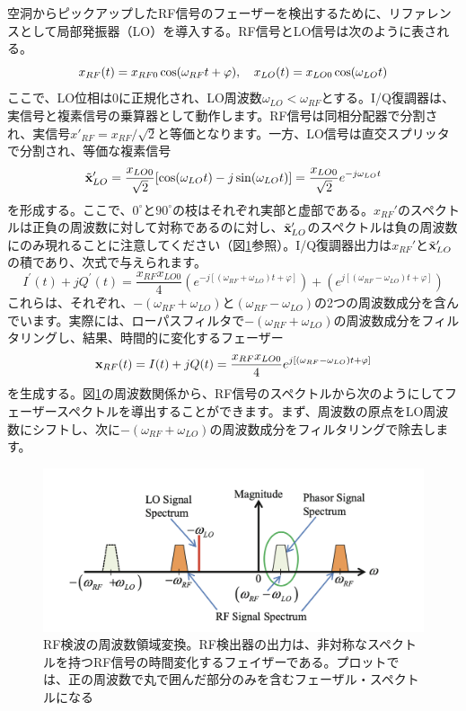 \documentclass[book]{jlreq}
\begin{document}
空洞からピックアップしたRF信号のフェーザーを検出するために、リファレンスとして局部発振器（LO）を導入する。RF信号とLO信号は次のように表される。
%
\begin{equation}
    x_{RF}(t) = x_{RF0}\cos(\omega_{RF} t+\varphi), \quad  x_{LO}(t) = x_{LO0}\cos(\omega_{LO} t)\notag
\end{equation}
%
ここで、LO位相は0に正規化され、LO周波数$\omega_{LO} < \omega_{RF}$とする。I/Q復調器は、実信号と複素信号の乗算器として動作します。RF信号は同相分配器で分割され、実信号$x'_{RF} = x_{RF}/\sqrt{2}$と等価となります。一方、LO信号は直交スプリッタで分割され、等価な複素信号
%
\begin{equation}
    \tilde{\vb{x}}^{\prime}_{LO} = \frac{x_{LO0}}{\sqrt{2}}[\cos(\omega_{LO} t) -j\sin(\omega_{LO} t)] 
    = \frac{x_{LO0}}{\sqrt{2}} e^{-j\omega_{LO} t}\notag
\end{equation}
%
を形成する。ここで、$0^{\circ}$と$90^{\circ}$の枝はそれぞれ実部と虚部である。$x_{RF}'$のスペクトルは正負の周波数に対して対称であるのに対し、$\tilde{\vb{x}}^{\prime}_{LO}$のスペクトルは負の周波数にのみ現れることに注意してください（図\ref{Fig3.3}参照）。I/Q復調器出力は$x_{RF}'$と$\tilde{\vb{x}}^{\prime}_{LO}$の積であり、次式で与えられます。
%
\begin{equation}
    I^{\prime}(t) + j Q^{\prime}(t) = \frac{x_{RF}x_{LO0}}{4}\left ( e^{-j[(\omega_{RF}+\omega_{LO})t+\varphi]}\right )
    + \left ( e^{j[(\omega_{RF}-\omega_{LO})t+\varphi]}\right )
    \label{eq:3.4}
\end{equation}
%
これらは、それぞれ、$-(\omega_{RF} + \omega_{LO})$と$(\omega_{RF} - \omega_{LO})$の2つの周波数成分を含んでいます。実際には、ローパスフィルタで$-(\omega_{RF} + \omega_{LO})$の周波数成分をフィルタリングし、結果、時間的に変化するフェーザー
%
\begin{equation}
    \vb{x}_{RF}(t) = I(t) + j Q(t) = \frac{x_{RF}x_{LO0}}{4}e^{j[(\omega_{RF}-\omega_{LO})t+\varphi]}
    \label{eq:3.5}
\end{equation}
%
を生成する。図\ref{Fig3.3}の周波数関係から、RF信号のスペクトルから次のようにしてフェーザースペクトルを導出することができます。まず、周波数の原点をLO周波数にシフトし、次に$-(\omega_{RF} + \omega_{LO})$の周波数成分をフィルタリングで除去します。
%
\begin{figure}[hbt]
    \begin{center}
      \includegraphics[width=12cm,clip]{figs/Fig3.3.png}
      \caption{RF検波の周波数領域変換。RF検出器の出力は、非対称なスペクトルを持つRF信号の時間変化するフェイザーである。プロットでは、正の周波数で丸で囲んだ部分のみを含むフェーザル・スペクトルになる}
     \label{Fig3.3}
    \end{center}
\end{figure}
\end{document}
